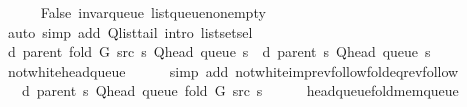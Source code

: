 \begin{isabellebody}
\ \ \ \ \isamarkupfalse%
\ False\ invar{\isacharunderscore}{\kern0pt}queue\ list{\isacharunderscore}{\kern0pt}queue{\isacharunderscore}{\kern0pt}non{\isacharunderscore}{\kern0pt}empty\isanewline
\ \ \ \ \isamarkupfalse%
\ {\isacharparenleft}{\kern0pt}auto\ simp\ add{\isacharcolon}{\kern0pt}\ Q{\isachardot}{\kern0pt}list{\isacharunderscore}{\kern0pt}tail\ intro{\isacharcolon}{\kern0pt}\ list{\isachardot}{\kern0pt}set{\isacharunderscore}{\kern0pt}sel{\isacharparenleft}{\kern0pt}{}{\isacharparenright}{\kern0pt}{\isacharparenright}{\kern0pt}\isanewline
\isanewline
\ \ \isamarkupfalse%
\ {\isachardoublequoteopen}d\ {\isacharparenleft}{\kern0pt}parent\ {\isacharparenleft}{\kern0pt}fold\ G\ src\ s{\isacharparenright}{\kern0pt}{\isacharparenright}{\kern0pt}\ {\isacharparenleft}{\kern0pt}Q{\isacharunderscore}{\kern0pt}head\ {\isacharparenleft}{\kern0pt}queue\ s{\isacharparenright}{\kern0pt}{\isacharparenright}{\kern0pt}\ {\isacharequal}{\kern0pt}\ d\ {\isacharparenleft}{\kern0pt}parent\ s{\isacharparenright}{\kern0pt}\ {\isacharparenleft}{\kern0pt}Q{\isacharunderscore}{\kern0pt}head\ {\isacharparenleft}{\kern0pt}queue\ s{\isacharparenright}{\kern0pt}{\isacharparenright}{\kern0pt}{\isachardoublequoteclose}\isanewline
\ \ \ \ \isamarkupfalse%
\ not{\isacharunderscore}{\kern0pt}white{\isacharunderscore}{\kern0pt}head{\isacharunderscore}{\kern0pt}queue\isanewline
\ \ \ \ \isamarkupfalse%
\ {\isacharparenleft}{\kern0pt}simp\ add{\isacharcolon}{\kern0pt}\ not{\isacharunderscore}{\kern0pt}white{\isacharunderscore}{\kern0pt}imp{\isacharunderscore}{\kern0pt}rev{\isacharunderscore}{\kern0pt}follow{\isacharunderscore}{\kern0pt}fold{\isacharunderscore}{\kern0pt}eq{\isacharunderscore}{\kern0pt}rev{\isacharunderscore}{\kern0pt}follow{\isacharparenright}{\kern0pt}\isanewline
\ \ \isamarkupfalse%
\ \isamarkupfalse%
\ {\isachardoublequoteopen}{\isachardot}{\kern0pt}{\isachardot}{\kern0pt}{\isachardot}{\kern0pt}\ {\isasymle}\ d\ {\isacharparenleft}{\kern0pt}parent\ s{\isacharparenright}{\kern0pt}\ {\isacharparenleft}{\kern0pt}Q{\isacharunderscore}{\kern0pt}head\ {\isacharparenleft}{\kern0pt}queue\ {\isacharparenleft}{\kern0pt}fold\ G\ src\ s{\isacharparenright}{\kern0pt}{\isacharparenright}{\kern0pt}{\isacharparenright}{\kern0pt}{\isachardoublequoteclose}\isanewline
\ \ \ \ \isamarkupfalse%
\ head{\isacharunderscore}{\kern0pt}queue{\isacharunderscore}{\kern0pt}fold{\isacharunderscore}{\kern0pt}mem{\isacharunderscore}{\kern0pt}queue\isanewline

\end{isabellebody}
